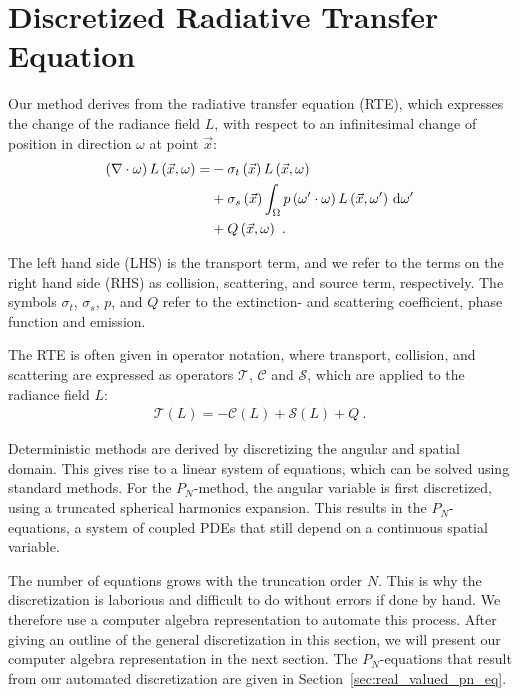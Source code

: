 \section{Discretized Radiative Transfer Equation}
\label{sec:discretized_rte}

Our method derives from the radiative transfer equation (RTE), which expresses the change of the radiance field $L$, with respect to an infinitesimal change of position in direction $\omega$ at point $\vec{x}$:
\begin{align}
\left(\nabla\cdot\omega\right)L\left(\vec{x}, \omega \right)
=&
-\sigma_t\left(\vec{x}\right) L\left(\vec{x}, \omega \right)\nonumber\\
&
+\sigma_s\left(\vec{x}\right) \int_{\Omega}
{
p\left(\omega'\cdot\omega\right)L\left(\vec{x}, \omega' \right)\,\mathrm{d}\omega'
}\nonumber\\
&
+Q\left(\vec{x}, \omega\right)\nonumber
\  .
\label{eq:rte}
\end{align}

The left hand side (LHS) is the transport term, and we refer to the terms on the right hand side (RHS) as collision, scattering, and source term, respectively. The symbols $\sigma_t$, $\sigma_s$, $p$, and $Q$ refer to the extinction- and scattering coefficient, phase function and emission.

The RTE is often given in operator notation, where transport, collision, and scattering are expressed as operators $\mathcal{T}$, $\mathcal{C}$ and $\mathcal{S}$, which are applied to the radiance field $L$:
\begin{align}
\mathcal{T}\left(L\right) = -\mathcal{C}\left(L\right) + \mathcal{S}\left(L\right) + Q
\ .
\end{align}

Deterministic methods are derived by discretizing the angular and spatial domain. This gives rise to a linear system of equations, which can be solved using standard methods. For the $P_N$-method, the angular variable is first discretized, using a truncated spherical harmonics expansion. This results in the $P_N$-equations, a system of coupled PDEs that still depend on a continuous spatial variable.

The number of equations grows with the truncation order $N$. This is why the discretization is laborious and difficult to do without errors if done by hand. We therefore use a computer algebra representation to automate this process. After giving an outline of the general discretization in this section, we will present our computer algebra representation in the next section. The $P_N$-equations that result from our automated discretization are given in Section~\ref{sec:real_valued_pn_eq}. 


